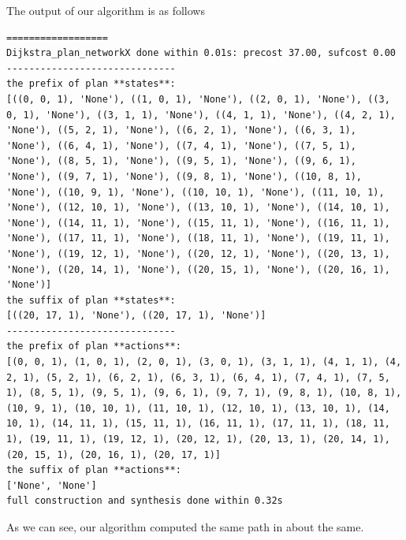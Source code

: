 The output of our algorithm is as follows

\begin{lstlisting}
==================
Dijkstra_plan_networkX done within 0.01s: precost 37.00, sufcost 0.00
------------------------------
the prefix of plan **states**:
[((0, 0, 1), 'None'), ((1, 0, 1), 'None'), ((2, 0, 1), 'None'), ((3, 0, 1), 'None'), ((3, 1, 1), 'None'), ((4, 1, 1), 'None'), ((4, 2, 1), 'None'), ((5, 2, 1), 'None'), ((6, 2, 1), 'None'), ((6, 3, 1), 'None'), ((6, 4, 1), 'None'), ((7, 4, 1), 'None'), ((7, 5, 1), 'None'), ((8, 5, 1), 'None'), ((9, 5, 1), 'None'), ((9, 6, 1), 'None'), ((9, 7, 1), 'None'), ((9, 8, 1), 'None'), ((10, 8, 1), 'None'), ((10, 9, 1), 'None'), ((10, 10, 1), 'None'), ((11, 10, 1), 'None'), ((12, 10, 1), 'None'), ((13, 10, 1), 'None'), ((14, 10, 1), 'None'), ((14, 11, 1), 'None'), ((15, 11, 1), 'None'), ((16, 11, 1), 'None'), ((17, 11, 1), 'None'), ((18, 11, 1), 'None'), ((19, 11, 1), 'None'), ((19, 12, 1), 'None'), ((20, 12, 1), 'None'), ((20, 13, 1), 'None'), ((20, 14, 1), 'None'), ((20, 15, 1), 'None'), ((20, 16, 1), 'None')]
the suffix of plan **states**:
[((20, 17, 1), 'None'), ((20, 17, 1), 'None')]
------------------------------
the prefix of plan **actions**:
[(0, 0, 1), (1, 0, 1), (2, 0, 1), (3, 0, 1), (3, 1, 1), (4, 1, 1), (4, 2, 1), (5, 2, 1), (6, 2, 1), (6, 3, 1), (6, 4, 1), (7, 4, 1), (7, 5, 1), (8, 5, 1), (9, 5, 1), (9, 6, 1), (9, 7, 1), (9, 8, 1), (10, 8, 1), (10, 9, 1), (10, 10, 1), (11, 10, 1), (12, 10, 1), (13, 10, 1), (14, 10, 1), (14, 11, 1), (15, 11, 1), (16, 11, 1), (17, 11, 1), (18, 11, 1), (19, 11, 1), (19, 12, 1), (20, 12, 1), (20, 13, 1), (20, 14, 1), (20, 15, 1), (20, 16, 1), (20, 17, 1)]
the suffix of plan **actions**:
['None', 'None']
full construction and synthesis done within 0.32s 
\end{lstlisting}


As we can see, our algorithm computed the same path in about the same.%
